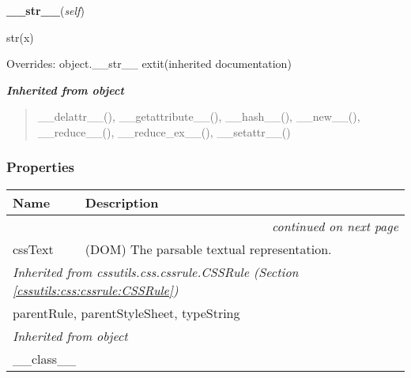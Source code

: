     \vspace{0.5ex}

\hspace{.8\funcindent}\begin{boxedminipage}{\funcwidth}

    \raggedright \textbf{\_\_str\_\_}(\textit{self})

\setlength{\parskip}{2ex}
    str(x)

\setlength{\parskip}{1ex}
      Overrides: object.\_\_str\_\_ 	extit{(inherited documentation)}

    \end{boxedminipage}


\large{\textbf{\textit{Inherited from object}}}

\begin{quote}
\_\_delattr\_\_(), \_\_getattribute\_\_(), \_\_hash\_\_(), \_\_new\_\_(), \_\_reduce\_\_(), \_\_reduce\_ex\_\_(), \_\_setattr\_\_()
\end{quote}


  \subsubsection{Properties}

    \vspace{-1cm}
\hspace{\varindent}\begin{longtable}{|p{\varnamewidth}|p{\vardescrwidth}|l}
\cline{1-2}
\cline{1-2} \centering \textbf{Name} & \centering \textbf{Description}& \\
\cline{1-2}
\endhead\cline{1-2}\multicolumn{3}{r}{\small\textit{continued on next page}}\\\endfoot\cline{1-2}
\endlastfoot\raggedright c\-s\-s\-T\-e\-x\-t\- & \raggedright (DOM) The parsable textual representation.&\\
\cline{1-2}
\multicolumn{2}{|l|}{\textit{Inherited from cssutils.css.cssrule.CSSRule \textit{(Section \ref{cssutils:css:cssrule:CSSRule})}}}\\
\multicolumn{2}{|p{\varwidth}|}{\raggedright parentRule, parentStyleSheet, typeString}\\
\cline{1-2}
\multicolumn{2}{|l|}{\textit{Inherited from object}}\\
\multicolumn{2}{|p{\varwidth}|}{\raggedright \_\_class\_\_}\\
\cline{1-2}
\end{longtable}


